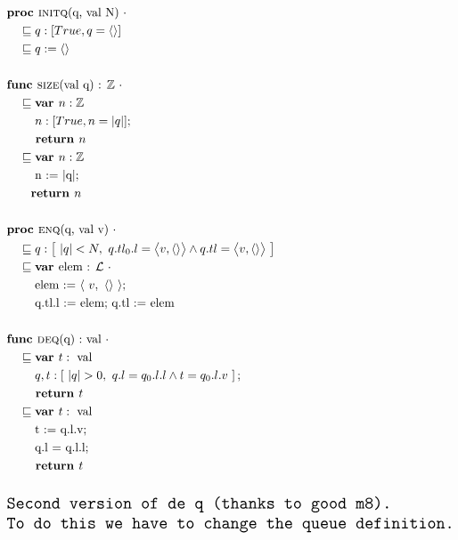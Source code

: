 \documentclass[a4paper]{scrartcl}
\newcommand{\Z}{\mathbb{Z}}
\newcommand{\refinedby}{\sqsubseteq} %
\begin{document}
\begin{align*}
& \textbf{proc }\text{\textsc{initq}(q, val N) } \cdot \\ 
    &\quad \refinedby  q : [True, q = \langle \rangle ] \\
    & \quad \refinedby q := \langle \rangle \\\\
& \textbf{func }\text{\textsc{size}(val q) : }\Z~ \cdot \\
    & \quad \refinedby \textbf{var }n : \Z \\
    & \quad \quad ~ n : [True, n = |q|] ; \\
    & \quad \quad \textbf{ return } n\\
    & \quad \refinedby \textbf{var }n : \Z \\
    & \quad \quad  \text{ n := $|$q$|$;} \\
    & \quad \quad \textbf{return } n \\\\
& \textbf{proc }\text{\textsc{enq}(q, val v) } \cdot\\
    & \quad \refinedby q : \left[~|q|< N, ~q.tl_0.l = \big\langle v, \langle \rangle \big\rangle \land q.tl =  \big\langle v, \langle \rangle \big\rangle ~\right] \\
    & \quad \refinedby \textbf{var } \text{elem : $\mathcal{L}$ } \cdot\\
    & \quad \quad \text{ elem := }\langle~v,~\langle \rangle~\rangle ;\\
    & \quad \quad \text{ q.tl.l := elem; q.tl :=  elem}\\\\
& \textbf{func }\text{\textsc{deq}(q) :} \text{ val } \cdot \\
    & \quad \refinedby \textbf{var }t : \text{ val} \\
    & \quad \quad ~q, t : \left[~|q| > 0,~q.l = q_0.l.l \land t = q_0.l.v~\right]; \\
    & \quad \quad \textbf{ return }t \\
    & \quad \refinedby \textbf{var }t : \text{ val} \\
    & \quad  \quad \text{ t := q.l.v;} \\
    & \quad  \quad \text{ q.l = q.l.l;} \\
    & \quad \quad \textbf{ return }t \\\\
& \texttt{\Large{Second version of de	q (thanks to good m8).}} \\
& \texttt{\Large{To do this we have to change the queue definition.}} \\
%
\end{align*}
\end{document}
